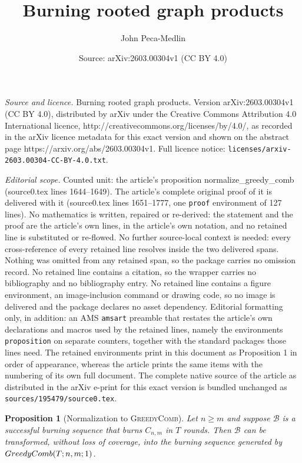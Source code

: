 \documentclass[10pt,a4paper]{amsart}
\title{Burning rooted graph products}
\author{John Peca-Medlin}
\date{Source: arXiv:2603.00304v1 (CC BY 4.0)}
\newtheorem{proposition}{Proposition}
\begin{document}
\maketitle

\noindent\emph{Source and licence.} Burning rooted graph products. Version arXiv:2603.00304v1 (CC BY 4.0), distributed by arXiv under the Creative Commons Attribution 4.0 International licence, http://creativecommons.org/licenses/by/4.0/, as recorded in the arXiv licence metadata for this exact version and shown on the abstract page https://arxiv.org/abs/2603.00304v1. Full licence notice: \texttt{licenses/arxiv-2603.00304-CC-BY-4.0.txt}.\par\smallskip

\noindent\textit{Editorial scope.} Counted unit: the article's proposition normalize\_greedy\_comb (source0.tex lines 1644--1649). The article's complete original proof of it is delivered with it (source0.tex lines 1651--1777, one \texttt{proof} environment of 127 lines). No mathematics is written, repaired or re-derived: the statement and the proof are the article's own lines, in the article's own notation, and no retained line is substituted or re-flowed.  No further source-local context is needed: every cross-reference of every retained line resolves inside the two delivered spans.  Nothing was omitted from any retained span, so the package carries no omission record.  No retained line contains a citation, so the wrapper carries no bibliography and no bibliography entry.  No retained line contains a figure environment, an image-inclusion command or drawing code, so no image is delivered and the package declares no asset dependency.  Editorial formatting only, in addition: an AMS \texttt{amsart} preamble that restates the article's own declarations and macros used by the retained lines, namely the environments \texttt{proposition} on separate counters, together with the standard packages those lines need.  The retained environments print in this document as Proposition 1 in order of appearance, whereas the article prints the same items with the numbering of its own full document.  The complete native source of the article as distributed in the arXiv e-print for this exact version is bundled unchanged as \texttt{sources/195479/source0.tex}.
\begin{proposition}[Normalization to \textsc{GreedyComb}]\label{prop: normalize_greedy_comb}
Let $n \ge m$ and suppose $\mathcal B$ is a successful burning sequence
that burns $C_{n,m}$ in $T$ rounds.
Then $\mathcal B$ can be transformed, without loss of coverage,
into the burning sequence generated by $\textsc{GreedyComb}(T;n,m;1)$.
\end{proposition}
\end{document}
